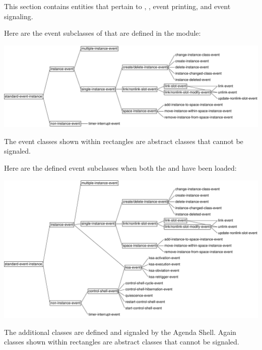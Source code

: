 \documentclass[10pt,twoside,english,pdftex]{article}
\begin{document}
This section contains  entities that pertain to
, , event printing, and event signaling.

%
Here are the event subclasses of  that
are defined in the  module:

\T\begin{ifhtml}
\T\end{ifhtml}
\W\begin{iftex} 
\begin{center}
\includegraphics[scale=0.85]{gbbopen-events}
\end{center}
\W\end{iftex}

\noindent The event classes shown within rectangles are abstract classes
that cannot be signaled.

\W{}

Here are the defined event subclasses when both the
 and  
have been loaded:
%
\T\begin{ifhtml}
\T\end{ifhtml}
\W\begin{iftex} 
\begin{center}
\includegraphics[scale=0.85]{agenda-shell-events}
\end{center}
\W\end{iftex}
%
The additional  classes are defined and
signaled by the Agenda Shell.  Again classes shown within rectangles are
abstract classes that cannot be signaled.
\end{document}

